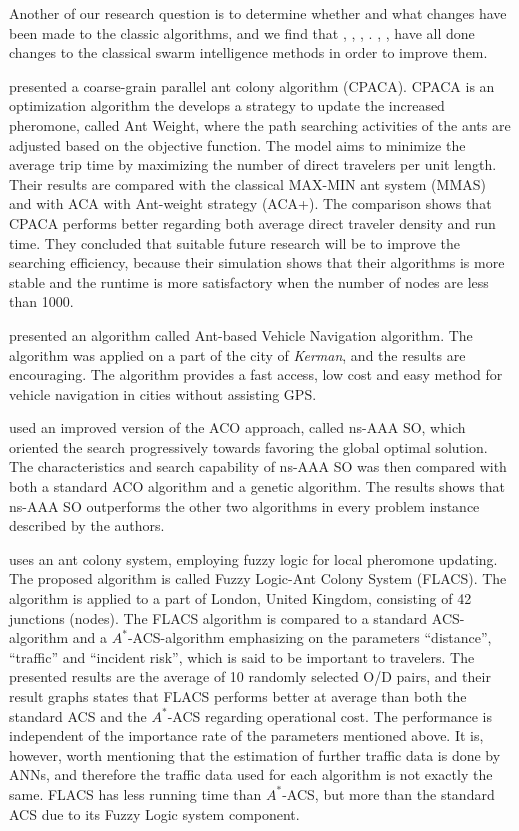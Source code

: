 Another of our research question is to determine whether and what changes have been made to the classic algorithms, and we find that \citet{yang07}, \citet{salehi-nezhad07}, \citet{tripathi09}, \citet{salehinejad10}. \citet{jiang10}, \citet{dias14}, \citet{sedighpour14} have all done changes to the classical swarm intelligence methods in order to improve them.

\citet{yang07} presented a coarse-grain parallel ant colony algorithm (CPACA). CPACA is an optimization algorithm the develops a strategy to update the increased pheromone, called Ant Weight, where the path searching activities of the ants are adjusted based on the objective function. The model aims to minimize the average trip time by maximizing the number of direct travelers per unit length. Their results are compared with the classical MAX-MIN ant system (MMAS)\citep{stutzle99} and with ACA with Ant-weight strategy (ACA+). The comparison shows that CPACA performs better regarding both average direct traveler density and run time. They concluded that suitable future research will be to improve the searching efficiency, because their simulation shows that their algorithms is more stable and the runtime is more satisfactory when the number of nodes are less than 1000. 

\citet{salehi-nezhad07} presented an algorithm called Ant-based Vehicle Navigation algorithm. The algorithm was applied on a part of the city of \textit{Kerman}, and the results are encouraging. The algorithm provides a fast access, low cost and easy method for vehicle navigation in cities without assisting GPS.

\citet{tripathi09} used an improved version of the ACO approach, called ns-AAA SO, which oriented the search progressively towards favoring the global optimal solution. The characteristics and search capability of ns-AAA SO was then compared with both a standard ACO algorithm and a genetic algorithm. The results shows that ns-AAA SO outperforms the other two algorithms in every problem instance described by the authors. 

\citet{salehinejad10} uses an ant colony system, employing fuzzy logic for local pheromone updating. The proposed algorithm is called Fuzzy Logic-Ant Colony System (FLACS). The algorithm is applied to a part of London, United Kingdom, consisting of 42 junctions (nodes). The FLACS algorithm is compared to a standard ACS-algorithm and a $A^*$-ACS-algorithm emphasizing on the parameters ``distance'', ``traffic'' and ``incident risk'', which is said to be important to travelers. The presented results are the average of 10 randomly selected O/D pairs, and their result graphs states that FLACS performs better at average than both the standard ACS and the $A^*$-ACS regarding operational cost. The performance is independent of the importance rate of the parameters mentioned above. It is, however, worth mentioning that the estimation of further traffic data is done by ANNs, and therefore the traffic data used for each algorithm is not exactly the same. FLACS has less running time than $A^*$-ACS, but more than the standard ACS due to its Fuzzy Logic system component. 

